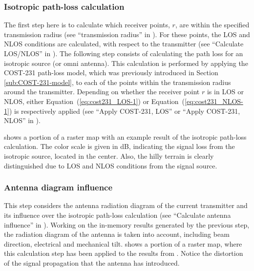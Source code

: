 \subsubsection{Isotropic path-loss calculation\label{sub:Path-loss-for-isotrophic-source}}

The first step here is to calculate which receiver points, $r$, are
within the specified transmission radius (see ``transmission radius''
in ). For these points,
the LOS and NLOS conditions are calculated, with respect to the transmitter
(see ``Calculate LOS/NLOS'' in ).
The following step consists of calculating the path loss for an isotropic
source (or omni antenna). This calculation is performed by applying
the COST-231 path-loss model, which was previously introduced in Section
\ref{sub:COST-231-model}, to each of the points within the transmission
radius around the transmitter. Depending on whether the receiver point
$r$ is in LOS or NLOS, either Equation~(\ref{eq:cost231_LOS-1})
or Equation~(\ref{eq:cost231_NLOS-1}) is respectively applied (see
``Apply COST-231, LOS'' or ``Apply COST-231, NLOS'' in ).

 shows a portion of a raster map
with an example result of the isotropic path-loss calculation. The
color scale is given in dB, indicating the signal loss from the isotropic
source, located in the center. Also, the hilly terrain is clearly
distinguished due to LOS and NLOS conditions from the signal source.


\subsubsection{Antenna diagram influence\label{sub:Antenna-diagram-influence}}

This step considers the antenna radiation diagram of the current transmitter
and its influence over the isotropic path-loss calculation (see ``Calculate
antenna influence'' in ).
Working on the in-memory results generated by the previous step, the
radiation diagram of the antenna is taken into account, including
beam direction, electrical and mechanical tilt. 
shows a portion of a raster map, where this calculation step has been
applied to the results from . Notice
the distortion of the signal propagation that the antenna has introduced.


